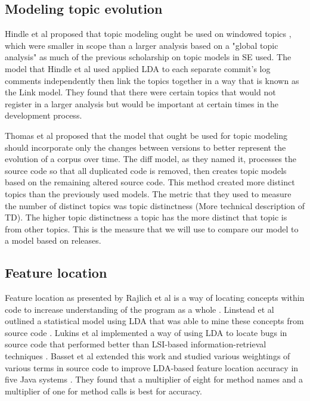 \subsection{ Modeling topic evolution }

Hindle et al proposed that topic modeling ought be used on windowed topics \cite{Hindle2009}, which were smaller in scope than a larger analysis based on a "global topic analysis" as much of the previous scholarship on topic models in SE used.
The model that Hindle et al used applied LDA to each separate commit's log comments independently then link the topics together in a way that is known as the Link model.
They found that there were certain topics that would not register in a larger analysis but would be important at certain times in the development process.

Thomas et al proposed that the model that ought be used for topic modeling should incorporate only the changes between versions \cite{Thomas2011} to better represent the evolution of a corpus over time.
The diff model, as they named it, processes the source code so that all duplicated code is removed, then creates topic models based on the remaining altered source code.
This method created more distinct topics than the previously used models.
The metric that they used to measure the number of distinct topics was topic distinctness (More technical description of TD).
The higher topic distinctness a topic has the more distinct that topic is from other topics.
This is the measure that we will use to compare our model to a model based on releases.

\subsection{Feature location}

Feature location as presented by Rajlich et al
is a way of locating concepts within code to increase understanding of the program as a whole \cite{Rajlich2002}.
Linstead et al outlined a statistical model using LDA that was able to mine these concepts from source code \cite{Linstead2007_2}.
Lukins et al implemented a way of using LDA to locate bugs in source code that performed better than LSI-based information-retrieval techniques \cite{Lukins2008}.
Basset et al extended this work and studied various weightings of various terms in source code to improve LDA-based feature location accuracy in five Java systems \cite{Bassett2013}.
They found that a multiplier of eight for method names and a multiplier of one for method calls is best for accuracy.



